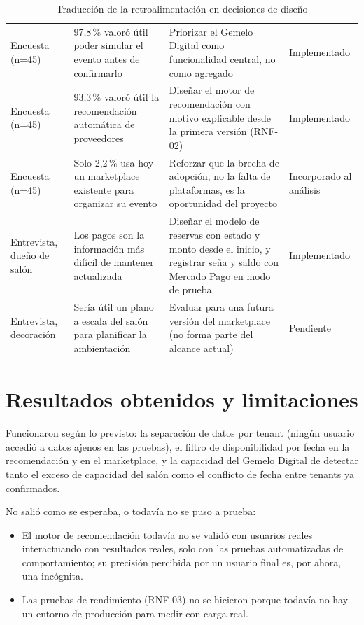 \begin{table}[H]
    \centering
    \caption{Traducción de la retroalimentación en decisiones de diseño}
    \label{tab:feedback-decisiones}
    \small
    \begin{tabularx}{\textwidth}{L L L l}
        \toprule
         &  &  &  \\
        \midrule
        Encuesta (n=45) & 97,8\,\% valoró útil poder simular el evento antes de confirmarlo & Priorizar el Gemelo Digital como funcionalidad central, no como agregado & Implementado \\
        Encuesta (n=45) & 93,3\,\% valoró útil la recomendación automática de proveedores & Diseñar el motor de recomendación con motivo explicable desde la primera versión (RNF-02) & Implementado \\
        Encuesta (n=45) & Solo 2,2\,\% usa hoy un marketplace existente para organizar su evento & Reforzar que la brecha de adopción, no la falta de plataformas, es la oportunidad del proyecto & Incorporado al análisis \\
        Entrevista, dueño de salón & Los pagos son la información más difícil de mantener actualizada & Diseñar el modelo de reservas con estado y monto desde el inicio, y registrar seña y saldo con Mercado Pago en modo de prueba & Implementado \\
        Entrevista, decoración & Sería útil un plano a escala del salón para planificar la ambientación & Evaluar para una futura versión del marketplace (no forma parte del alcance actual) & Pendiente \\
        \bottomrule
    \end{tabularx}
\end{table}

\section{Resultados obtenidos y limitaciones}

Funcionaron según lo previsto: la separación de datos por tenant (ningún
usuario accedió a datos ajenos en las pruebas), el filtro de
disponibilidad por fecha en la recomendación y en el marketplace, y la
capacidad del Gemelo Digital de detectar tanto el exceso de capacidad del
salón como el conflicto de fecha entre tenants ya confirmados.

No salió como se esperaba, o todavía no se puso a prueba:

\begin{itemize}
    \item El motor de recomendación todavía no se validó con usuarios
          reales interactuando con resultados reales, solo con las
          pruebas automatizadas de comportamiento; su precisión
          percibida por un usuario final es, por ahora, una incógnita.
    \item Las pruebas de rendimiento (RNF-03) no se hicieron porque
          todavía no hay un entorno de producción para medir con carga
          real.
\end{itemize}
